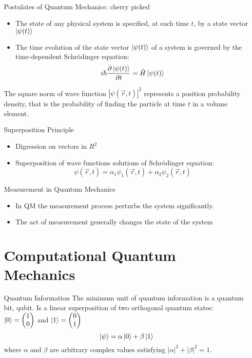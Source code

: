 \documentclass[10pt]{beamer}
\begin{document}
\begin{frame}{Postulates of Quantum Mechanics: cherry picked}
\begin{itemize}
\pause \item The state of any physical system is specified, at each time $t$, by a state vector $\ket{\psi (t)}$
\pause \item The time evolution of the state vector $\ket{\psi (t)}$ of a system is governed by the time-dependent Schrödinger equation:
$$i\hbar \frac{\partial \ket{\psi (t)}}{\partial t} = \hat H \ket{\psi (t)}$$
\end{itemize}
\pause The square norm of wave function $|\psi (\vec r, t)|^2$ represents a position probability density, that is the probability of finding the particle at time $t$ in a volume element.
\end{frame}

\begin{frame}{Superposition Principle}
\begin{itemize}
\item Digression on vectors in $R^2$
\item Superposition of wave functions solutions of Schrödinger equation: $$\psi (\vec r, t) = \alpha_1 \psi_1(\vec r, t) + \alpha_2 \psi_2(\vec r, t)$$
\end{itemize}
\end{frame}

\begin{frame}{Measurement in Quantum Mechanics}
\begin{itemize}
\item In QM the measurement process perturbs the system significantly.
\item The act of measurement generally changes the state of the system
\end{itemize}
\end{frame}

\section{Computational Quantum Mechanics}

\begin{frame}{Quantum Information}
The minimum unit of quantum information is a quantum bit, \alert{qubit}. Is a linear superposition of two orthogonal quantum states:\\ $\ket{0} = \left( \begin{matrix} 1 \\ 0 \end{matrix} \right)$ and $\ket{1} = \left( \begin{matrix} 0 \\ 1 \end{matrix} \right)$\\
$$\ket{\psi} = \alpha \ket{0} + \beta \ket{1}$$
where $\alpha$ and $\beta$ are arbitrary complex values satisfying $|\alpha|^2 + |\beta|^2 = 1$.
\end{frame}
\end{document}
